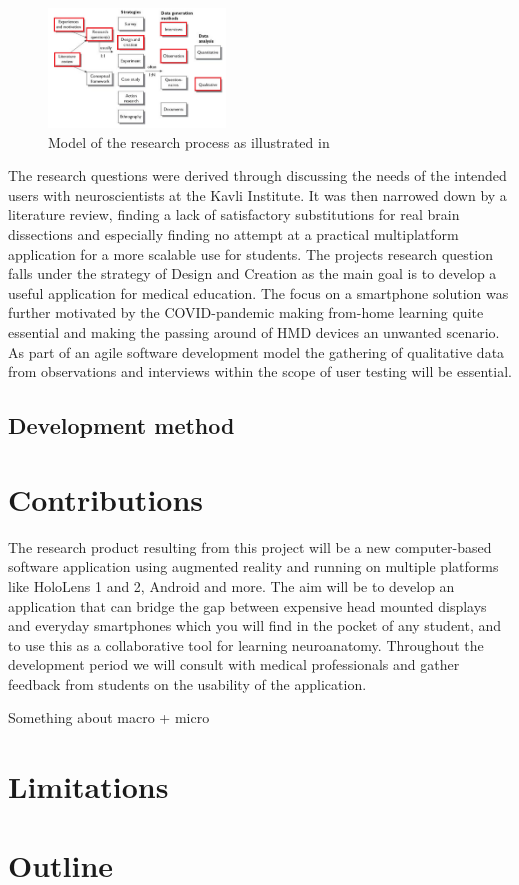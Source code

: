 \begin{figure}
    \begin{center}
        \includegraphics[width=0.42\textwidth]{fig/researchplan_image}
    \end{center}
    \caption{Model of the research process as illustrated in \citet{oates2006} }
    \label{researchplan_img}
\end{figure}

The research questions were derived through discussing the needs of the intended users with neuroscientists at the Kavli Institute. It was then narrowed down by a literature review, finding a lack of satisfactory substitutions for real brain dissections and especially finding no attempt at a practical multiplatform application for a more scalable use for students. The projects research question falls under the strategy of Design and Creation as the main goal is to develop a useful application for medical education. The focus on a smartphone solution was further motivated by the COVID-pandemic making from-home learning quite essential and making the passing around of HMD devices an unwanted scenario. As part of an agile software development model the gathering of qualitative data from observations and interviews within the scope of user testing will be essential. 

\subsection*{Development method}

\section{Contributions}

The research product resulting from this project will be a new computer-based software application using augmented reality and running on multiple platforms like HoloLens 1 and 2, Android and more. The aim will be to develop an application that can bridge the gap between expensive head mounted displays and everyday smartphones which you will find in the pocket of any student, and to use this as a collaborative tool for learning neuroanatomy. Throughout the development period we will consult with medical professionals and gather feedback from students on the usability of the application.

{
    \color{BrickRed}
    \noindent
    \newline
    Something about macro + micro
}

\section{Limitations}

\section{Outline}

